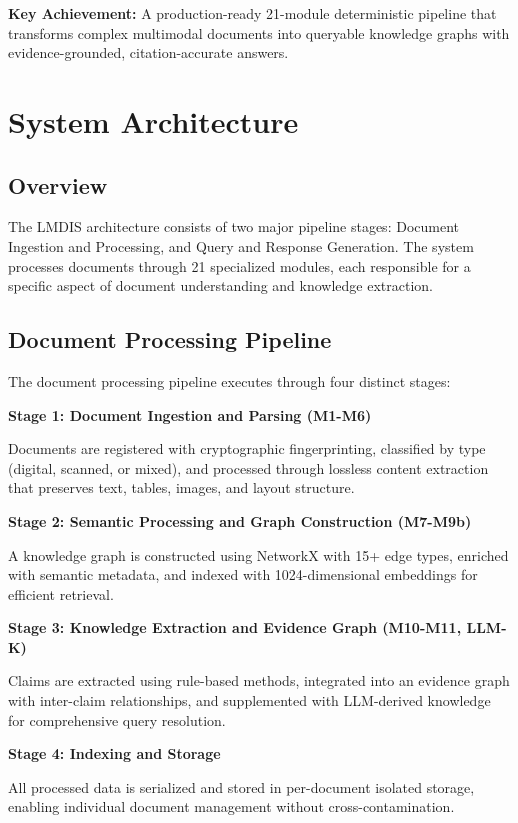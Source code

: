 \documentclass[11pt,a4paper]{article}
\begin{document}
\textbf{Key Achievement:} A production-ready 21-module deterministic pipeline that transforms complex multimodal documents into queryable knowledge graphs with evidence-grounded, citation-accurate answers.

\clearpage
\section{System Architecture}

\subsection{Overview}

The LMDIS architecture consists of two major pipeline stages: Document Ingestion and Processing, and Query and Response Generation. The system processes documents through 21 specialized modules, each responsible for a specific aspect of document understanding and knowledge extraction.

\subsection{Document Processing Pipeline}

The document processing pipeline executes through four distinct stages:

\textbf{Stage 1: Document Ingestion and Parsing (M1-M6)}

Documents are registered with cryptographic fingerprinting, classified by type (digital, scanned, or mixed), and processed through lossless content extraction that preserves text, tables, images, and layout structure.

\textbf{Stage 2: Semantic Processing and Graph Construction (M7-M9b)}

A knowledge graph is constructed using NetworkX with 15+ edge types, enriched with semantic metadata, and indexed with 1024-dimensional embeddings for efficient retrieval.

\textbf{Stage 3: Knowledge Extraction and Evidence Graph (M10-M11, LLM-K)}

Claims are extracted using rule-based methods, integrated into an evidence graph with inter-claim relationships, and supplemented with LLM-derived knowledge for comprehensive query resolution.

\textbf{Stage 4: Indexing and Storage}

All processed data is serialized and stored in per-document isolated storage, enabling individual document management without cross-contamination.
\end{document}
